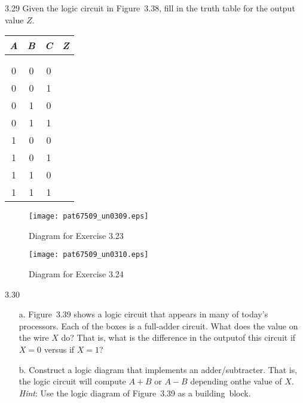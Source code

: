 \documentclass{patt}
\begin{document}
\begin{exercises}
\item[3.29] Given the logic circuit in Figure~3.38, fill in the truth
  table for the output value $Z$.

\begin{inlinetable}
\tabcolsep=12pt
\begin{tabular}{@{}ccc|c@{}}\hline
{\em A} & {\em B} & {\em C} & {\em Z}\rule{0pt}{10pt} \\ \hline\\[-10.6pt]
& & \rule{0pt}{1pt}\\[-6.7pt]
0 & 0 & 0 & \\[2.6pt]
0 & 0 & 1 &\\[2.6pt]
0 & 1 & 0 &\\[2.6pt]
0 & 1 & 1 &\\[2.6pt]
1 & 0 & 0 &\\[2.6pt]
1 & 0 & 1 &\\[2.6pt]
1 & 1 & 0 &\\[2.6pt]
1 & 1 & 1 &\\\hline
\end{tabular}
\end{inlinetable}

\begin{figure}[h]
\centerline{\texttt{[image: pat67509\_un0309.eps]}}
\caption{Diagram for Exercise 3.23}
\end{figure}

\newpage

\begin{figure}
\leftskip\leftmargini
\centerline{\texttt{[image: pat67509\_un0310.eps]}}
\caption{Diagram for Exercise 3.24}
\end{figure}

\item[3.30]
\begin{enumerate}
\item[a.]  Figure~3.39 shows a logic circuit that appears in many of
  today's processors. Each of the boxes is a full-adder circuit. What
  does the value on the wire $X$ do? That is, what is the difference
  in the output\hfill\break of this circuit if $X=0$ versus if $X=1$?

\item[b.]  Construct a logic diagram that implements an
  adder/subtracter. That is, the logic circuit will compute $A+B$ or
  $A-B$ depending on\hfill\break the value of $X$. {\em Hint}: Use the logic
  diagram of Figure~3.39 as a building~block.
\end{enumerate}


\end{exercises}
\end{document}
